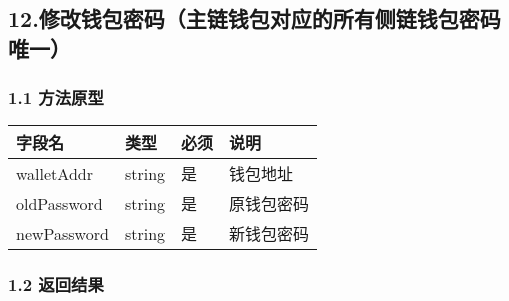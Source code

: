 \documentclass[letterpaper,10pt,english]{sphinxmanual}
\begin{document}

\begin{sphinxVerbatim}[commandchars=\\\{\}]
     
\end{sphinxVerbatim}


\subsection{12.修改钱包密码（主链钱包对应的所有侧链钱包密码唯一）}
\label{\detokenize{BCBWalletSDK_u63a5_u53e3_u8bf4_u660e:id50}}

\subsubsection{1.1 方法原型}
\label{\detokenize{BCBWalletSDK_u63a5_u53e3_u8bf4_u660e:id51}}



\begin{savenotes}\sphinxattablestart
\centering
\begin{tabulary}{\linewidth}[t]{|T|T|T|T|}
\hline
\sphinxstyletheadfamily 
字段名
&\sphinxstyletheadfamily 
类型
&\sphinxstyletheadfamily 
必须
&\sphinxstyletheadfamily 
说明
\\
\hline
walletAddr
&
string
&
是
&
钱包地址
\\
\hline
oldPassword
&
string
&
是
&
原钱包密码
\\
\hline
newPassword
&
string
&
是
&
新钱包密码
\\
\hline
\end{tabulary}
\par
\sphinxattableend\end{savenotes}


\subsubsection{1.2 返回结果}
\label{\detokenize{BCBWalletSDK_u63a5_u53e3_u8bf4_u660e:id52}}
\end{document}
